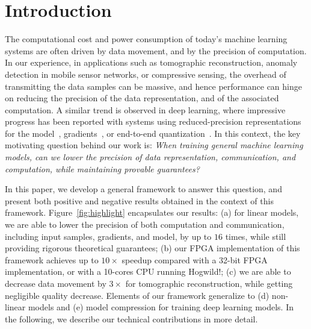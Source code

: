 \documentclass{article}
\begin{document}
\section{Introduction}

The computational cost and power consumption of today's machine learning systems are often driven by data movement, and by the precision of computation. 
In our experience, in applications such as tomographic reconstruction, anomaly detection in mobile sensor networks, or compressive sensing, the overhead of transmitting the data samples can be massive, 
and hence performance can hinge on reducing the precision of the data representation, and of the associated computation. 
A similar trend is observed in deep learning, where impressive progress has been reported with systems using reduced-precision representations for the model~\cite{m1, m2}, gradients~\cite{zzz}, 
or end-to-end quantization~\cite{m1, m2}. 
In this context, the key motivating question behind our work is:  
{\em When training general machine learning models,
can we lower the precision of data representation,
communication, and computation, while maintaining provable guarantees?}
 
% 
%

In this paper, we develop a general 
framework to answer this question, and
present both  positive and negative results
 obtained in the context of this framework. 
 Figure~\ref{fig:highlight} encapsulates our results: 
(a) for linear models, we are able to lower the precision of both computation and communication, including input samples, gradients, and model, by up to $16$ times, while still providing rigorous theoretical guarantees; 
(b) our FPGA implementation of this framework achieves up to $10\times$ speedup compared with
a 32-bit FPGA implementation, or with a 10-cores CPU running Hogwild!;  
(c) we are able to decrease data movement by $3\times$ for
tomographic reconstruction, while getting negligible quality decrease. 
Elements of our framework generalize to (d) non-linear models and  (e) model compression for training deep learning models. 
In the following, we describe our technical contributions in more detail. 
\end{document}
